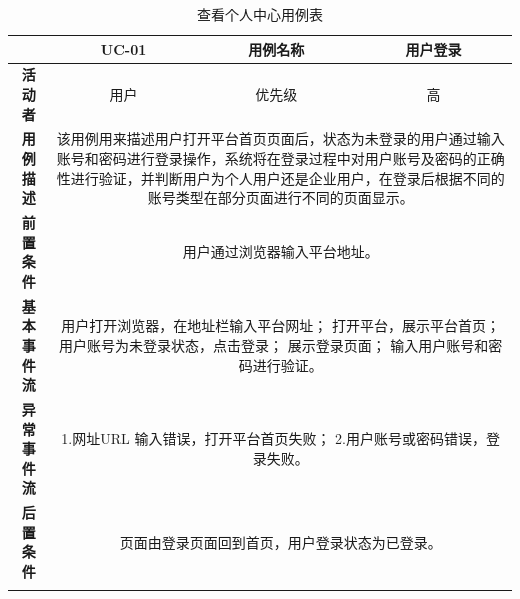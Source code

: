 \begin{longtable}[c]{c|ccc}
	\caption{查看个人中心用例表}
	\label{tab:tab3}\\
	\shline
	\multicolumn{1}{c|}{\textbf{用例编号}} & \multicolumn{1}{c|}{UC-01} & \multicolumn{1}{c|}{用例名称} &  用户登录\\ \hline
	\endhead
	\multicolumn{1}{c|}{\textbf{活动者}} & \multicolumn{1}{c|}{用户} & \multicolumn{1}{c|}{优先级} &高  \\ \hline
	\textbf{用例描述} & \multicolumn{3}{p{12cm}}{该用例用来描述用户打开平台首页页面后，状态为未登录的用户通过输入账号和密码进行登录操作，系统将在登录过程中对用户账号及密码的正确性进行验证，并判断用户为个人用户还是企业用户，在登录后根据不同的账号类型在部分页面进行不同的页面显示。} \\ \hline
	\textbf{前置条件}& \multicolumn{3}{p{12cm}}{用户通过浏览器输入平台地址。} \\ \hline
	\textbf{基本事件流}& \multicolumn{3}{p{12cm}}{用户打开浏览器，在地址栏输入平台网址；\newline
		打开平台，展示平台首页；\newline
		用户账号为未登录状态，点击登录；\newline
		展示登录页面；\newline
		输入用户账号和密码进行验证。} \\ \hline
	\textbf{异常事件流}& \multicolumn{3}{p{12cm}}{1.网址URL 输入错误，打开平台首页失败；\newline
		2.用户账号或密码错误，登录失败。
	} \\ \hline
	\textbf{后置条件}& \multicolumn{3}{p{12cm}}{页面由登录页面回到首页，用户登录状态为已登录。} \\ \shline
\end{longtable}

